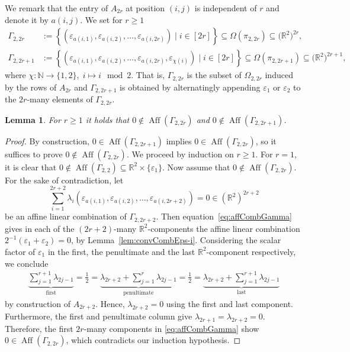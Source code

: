 \documentclass[10pt,a4paper]{article}
\newtheorem{lem}[thm]{Lemma}\crefname{lem}{Lemma}{Lemmas}
\numberwithin{equation}{section}
\DeclareMathOperator{\aff}{Aff}
\newcommand{\RR}{\mathbb R}
\newcommand{\NN}{\mathbb N}
\newcommand{\eps}{\varepsilon}
\begin{document}
We remark that the entry of $A_{2r}$ at position $(i,j)$ is independent of $r$ and denote it by $a(i,j)$. We set for $r \geq 1$
	\begin{align*}
	\Gamma_{2,2r} &:= \left\lbrace \left( \eps_{a(i,1)}, \eps_{a(i,2)}, \ldots, \eps_{a(i,2r)} \right) \mid i \in [2r] \right\rbrace \subseteq \Omega(\pi_{2,2r}) \subseteq \big( \RR^2 \big)^{2r},\\
	\Gamma_{2,2r+1} &:= \left\lbrace \left( \eps_{a(i,1)}, \eps_{a(i,2)}, \ldots, \eps_{a(i,2r)}, \eps_{\chi(i)} \right) \mid i \in [2r] \right\rbrace \subseteq \Omega(\pi_{2,2r+1}) \subseteq \big( \RR^2 \big)^{2r+1},
	\end{align*}
where $\chi \colon \NN \to \{1,2\}, \; i \mapsto i \mod 2$. That is, $\Gamma_{2,2r}$ is the subset of $\Omega_{2,2r}$ induced by the rows of $A_{2r}$ and $\Gamma_{2,2r+1}$ is obtained by alternatingly appending $\eps_1$ or $\eps_2$ to the $2r$-many elements of $\Gamma_{2,2r}$.
	
\begin{lem}\label{lem:affHullQubits}
For $r \geq 1$ it holds that $0 \notin \aff(\Gamma_{2,2r})$ and $0 \notin \aff(\Gamma_{2,2r+1})$.
\end{lem}

\begin{proof}
By construction, $0 \in \aff(\Gamma_{2,2r+1})$ implies $0 \in \aff(\Gamma_{2,2r})$, so it suffices to prove $0 \notin \aff(\Gamma_{2,2r})$. We proceed by induction on $r \geq 1$. For $r=1$, it is clear that $0 \notin \aff(\Gamma_{2,2}) \subseteq \RR^2 \times \lbrace \eps_1 \rbrace$.
Now assume that $0 \notin \aff(\Gamma_{2,2r})$. For the sake of contradiction, let
	\begin{equation}\label{eq:affCombGamma}
	\sum_{i=1}^{2r+2} \lambda_i \left( \eps_{a(i,1)}, \eps_{a(i,2)}, \ldots, \eps_{a(i,2r+2)} \right) = 0 \in \left( \RR^2 \right)^{2r+2}
	\end{equation}
be an affine linear combination of $\Gamma_{2,2r+2}$. Then equation~\eqref{eq:affCombGamma} gives in each of the $(2r+2)$-many $\RR^2$-components the affine linear combination $2^{-1} (\eps_1 + \eps_2) = 0$, by Lemma~\ref{lem:convCombEps-i}. Considering the scalar factor of $\eps_1$ in the first, the penultimate and the last $\RR^{2}$-component respectively, we conclude
	\begin{align*}
	\underbrace{ \sum_{j=1}^{r+1} \lambda_{2j-1} }_{\text{first}} = \frac{1}{2}
	= \underbrace{ \lambda_{2r+2} + \sum_{j=1}^{r} \lambda_{2j-1} }_{\text{penultimate}} 
	= \frac{1}{2} = \underbrace { \lambda_{2r+2} + \sum_{j=1}^{r+1} \lambda_{2j-1} }_{\text{last}}
	\end{align*}
by construction of $A_{2r+2}$. Hence, $\lambda_{2r+2} = 0$ using the first and last component. Furthermore, the first and penultimate column give $\lambda_{2r+1} = \lambda_{2r+2} = 0$. Therefore, the first $2r$-many components in \cref{eq:affCombGamma} show $0 \in \aff(\Gamma_{2,2r})$, which contradicts our induction hypothesis.
\end{proof}
\end{document}
